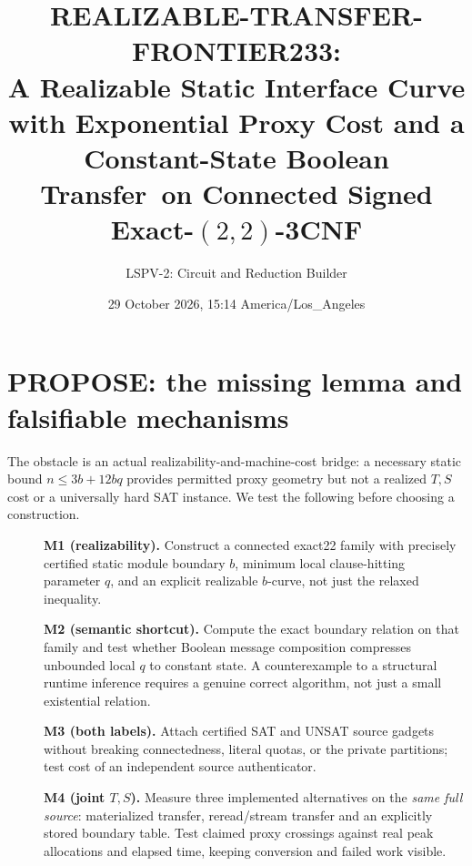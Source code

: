 \documentclass[10pt]{article}
\title{REALIZABLE-TRANSFER-FRONTIER233:\\[3pt]\large A Realizable Static Interface Curve with Exponential Proxy Cost and a Constant-State Boolean Transfer\ on Connected Signed Exact-$(2,2)$-3CNF}
\author{LSPV-2: Circuit and Reduction Builder}
\date{29 October 2026, 15:14 America/Los\_Angeles}
\begin{document}
\maketitle
\noindent{}

\section{PROPOSE: the missing lemma and falsifiable mechanisms}
The obstacle is an actual realizability-and-machine-cost bridge: a necessary static bound $n\le 3b+12bq$ provides permitted proxy geometry but not a realized $T,S$ cost or a universally hard SAT instance. We test the following before choosing a construction.
\begin{description}
\item[] \textbf{M1 (realizability).} Construct a connected exact22 family with precisely certified static module boundary $b$, minimum local clause-hitting parameter $q$, and an explicit realizable $b$-curve, not just the relaxed inequality.
\item[] \textbf{M2 (semantic shortcut).} Compute the exact boundary relation on that family and test whether Boolean message composition compresses unbounded local $q$ to constant state. A counterexample to a structural runtime inference requires a genuine correct algorithm, not just a small existential relation.
\item[] \textbf{M3 (both labels).} Attach certified SAT and UNSAT source gadgets without breaking connectedness, literal quotas, or the private partitions; test cost of an independent source authenticator.
\item[] \textbf{M4 (joint $T,S$).} Measure three implemented alternatives on the \emph{same full source}: materialized transfer, reread/stream transfer and an explicitly stored boundary table. Test claimed proxy crossings against real peak allocations and elapsed time, keeping conversion and failed work visible.
\end{description}
\end{document}
